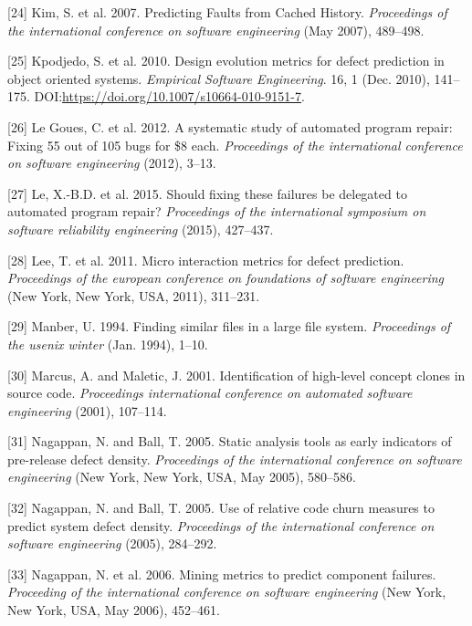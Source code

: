 \documentclass[sigconf]{acmart}
\begin{document}
\hypertarget{ref-Kim2007a}{}
{[}24{]} Kim, S. et al. 2007. Predicting Faults from Cached History.
\emph{Proceedings of the international conference on software
engineering} (May 2007), 489--498.

\hypertarget{ref-Kpodjedo2010}{}
{[}25{]} Kpodjedo, S. et al. 2010. Design evolution metrics for defect
prediction in object oriented systems. \emph{Empirical Software
Engineering}. 16, 1 (Dec. 2010), 141--175.
DOI:\url{https://doi.org/10.1007/s10664-010-9151-7}.

\hypertarget{ref-le2012systematic}{}
{[}26{]} Le Goues, C. et al. 2012. A systematic study of automated
program repair: Fixing 55 out of 105 bugs for \$8 each.
\emph{Proceedings of the international conference on software
engineering} (2012), 3--13.

\hypertarget{ref-le2015should}{}
{[}27{]} Le, X.-B.D. et al. 2015. Should fixing these failures be
delegated to automated program repair? \emph{Proceedings of the
international symposium on software reliability engineering} (2015),
427--437.

\hypertarget{ref-Lee2011a}{}
{[}28{]} Lee, T. et al. 2011. Micro interaction metrics for defect
prediction. \emph{Proceedings of the european conference on foundations
of software engineering} (New York, New York, USA, 2011), 311--231.

\hypertarget{ref-Manber1994}{}
{[}29{]} Manber, U. 1994. Finding similar files in a large file system.
\emph{Proceedings of the usenix winter} (Jan. 1994), 1--10.

\hypertarget{ref-Marcus}{}
{[}30{]} Marcus, A. and Maletic, J. 2001. Identification of high-level
concept clones in source code. \emph{Proceedings international
conference on automated software engineering} (2001), 107--114.

\hypertarget{ref-Nagappan2005}{}
{[}31{]} Nagappan, N. and Ball, T. 2005. Static analysis tools as early
indicators of pre-release defect density. \emph{Proceedings of the
international conference on software engineering} (New York, New York,
USA, May 2005), 580--586.

\hypertarget{ref-Nagappan}{}
{[}32{]} Nagappan, N. and Ball, T. 2005. Use of relative code churn
measures to predict system defect density. \emph{Proceedings of the
international conference on software engineering} (2005), 284--292.

\hypertarget{ref-Nagappan2006}{}
{[}33{]} Nagappan, N. et al. 2006. Mining metrics to predict component
failures. \emph{Proceeding of the international conference on software
engineering} (New York, New York, USA, May 2006), 452--461.
\end{document}
